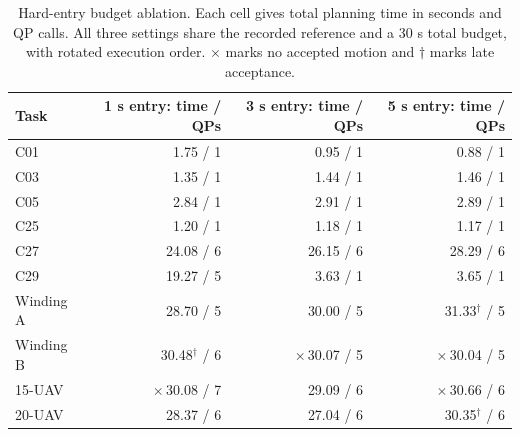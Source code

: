 \begin{table}[htbp]

\caption{Hard-entry budget ablation. Each cell gives total planning time in seconds and QP calls. All three settings share the recorded reference and a 30 s total budget, with rotated execution order. $\times$ marks no accepted motion and $\dagger$ marks late acceptance.\label{tab:entry-budget-response}}
\small\begin{tabularx}{\textwidth}{Xrrr}\toprule
Task & 1 s entry: time / QPs & \textbf{3 s entry: time / QPs} & 5 s entry: time / QPs\\\midrule
C01 & 1.75 / 1 & 0.95 / 1 & 0.88 / 1\\
C03 & 1.35 / 1 & 1.44 / 1 & 1.46 / 1\\
C05 & 2.84 / 1 & 2.91 / 1 & 2.89 / 1\\
C25 & 1.20 / 1 & 1.18 / 1 & 1.17 / 1\\
C27 & 24.08 / 6 & 26.15 / 6 & 28.29 / 6\\
C29 & 19.27 / 5 & 3.63 / 1 & 3.65 / 1\\
Winding A & 28.70 / 5 & 30.00 / 5 & 31.33$^{\dagger}$ / 5\\
Winding B & 30.48$^{\dagger}$ / 6 & $\times$\,30.07 / 5 & $\times$\,30.04 / 5\\
15-UAV & $\times$\,30.08 / 7 & 29.09 / 6 & $\times$\,30.66 / 6\\
20-UAV & 28.37 / 6 & 27.04 / 6 & 30.35$^{\dagger}$ / 6\\
\bottomrule\end{tabularx}
\end{table}
